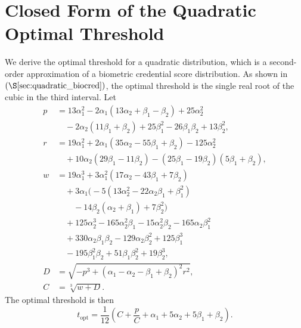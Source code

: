 \documentclass[conference,compsoc]{IEEEtran}
\begin{document}
\section{Closed Form of the Quadratic Optimal Threshold}\label{app:quad_opt_thr}
\noindent
We derive the optimal threshold for a quadratic distribution, which is a second-order approximation of a biometric credential score distribution. As shown in~$(\S\ref{sec:quadratic_biocred})$, the optimal threshold is the single real root of the cubic in the third interval.
Let
\begin{align*}
p &= 13\alpha_1^2 - 2\alpha_1(13\alpha_2 + \beta_1 - \beta_2) + 25\alpha_2^2 \\
  &\quad - 2\alpha_2(11\beta_1 + \beta_2) + 25\beta_1^2 - 26\beta_1\beta_2 + 13\beta_2^2, \\[4pt]
r &= 19\alpha_1^2 + 2\alpha_1(35\alpha_2 - 55\beta_1 + \beta_2) - 125\alpha_2^2 \\
  &\quad + 10\alpha_2(29\beta_1 - 11\beta_2) - (25\beta_1 - 19\beta_2)(5\beta_1 + \beta_2), \\[4pt]
w &= 19\alpha_1^3 + 3\alpha_1^2(17\alpha_2 - 43\beta_1 + 7\beta_2) \\
  &\quad + 3\alpha_1\bigl(-5(13\alpha_2^2 - 22\alpha_2\beta_1 + \beta_1^2) \\
  &\quad\quad - 14\beta_2(\alpha_2 + \beta_1) + 7\beta_2^2\bigr) \\
  &\quad + 125\alpha_2^3 - 165\alpha_2^2\beta_1 - 15\alpha_2^2\beta_2 - 165\alpha_2\beta_1^2 \\
  &\quad + 330\alpha_2\beta_1\beta_2 - 129\alpha_2\beta_2^2 + 125\beta_1^3 \\
  &\quad - 195\beta_1^2\beta_2 + 51\beta_1\beta_2^2 + 19\beta_2^3, \\[4pt]
D &= \sqrt{-p^3 + (\alpha_1 - \alpha_2 - \beta_1 + \beta_2)^2 r^2}, \\[4pt]
C &= \sqrt[3]{w + D}.
\end{align*}
The optimal threshold is then
\begin{equation*}
t_{\text{opt}} = \frac{1}{12}\left(C + \frac{p}{C} + \alpha_1 + 5\alpha_2 + 5\beta_1 + \beta_2\right).
\end{equation*}
\end{document}
